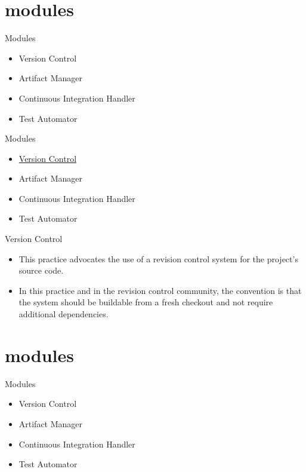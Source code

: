 \documentclass{beamer}
\begin{document}
\section{modules}
\begin{frame}{Modules}
\begin{itemize}
\item Version Control
\item Artifact Manager
\item Continuous Integration Handler
\item Test Automator

\end{itemize}

\end{frame}

\begin{frame}{Modules}
\begin{itemize}
\item \underline{Version Control}
\item Artifact Manager
\item Continuous Integration Handler
\item Test Automator

\end{itemize}

\end{frame}

\begin{frame}{Version Control}
\begin{itemize}
\item This practice advocates the use of a revision control system for the project’s source code.
\vspace{0.5 cm}
\item In this
practice and in the revision control community, the convention is that the system should
be buildable from a fresh checkout and not require additional dependencies.
\end{itemize}
\end{frame}


\section{modules}
\begin{frame}{Modules}
\begin{itemize}
\item Version Control
\item Artifact Manager
\item Continuous Integration Handler
\item Test Automator

\end{itemize}

\end{frame}
\end{document}
